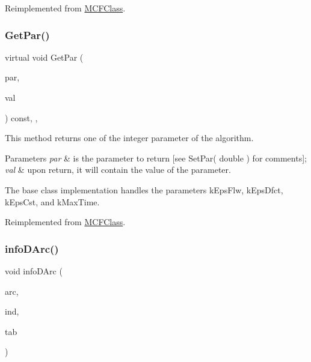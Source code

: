 Reimplemented from \mbox{\hyperlink{class_m_c_f_class_ac66ea95b63fe61ce67e0f8544f200887}{M\+C\+F\+Class}}.

\mbox{\label{class_m_c_f_simplex_a56cd6bb7b0a08a99f6acc82ef4bb4e9b}} 
\subsubsection{\texorpdfstring{Get\+Par()}{GetPar()}\hspace{0.1cm}{\footnotesize\ttfamily [2/2]}}
{\footnotesize\ttfamily virtual void Get\+Par (\begin{DoxyParamCaption}\item[{int}]{par,  }\item[{double \&}]{val }\end{DoxyParamCaption}) const\hspace{0.3cm}{\ttfamily [inline]}, {\ttfamily [override]}, {\ttfamily [virtual]}}

This method returns one of the integer parameter of the algorithm.


\begin{DoxyParams}{Parameters}
{\em par} & is the parameter to return \mbox{[}see Set\+Par( double ) for comments\mbox{]};\\
\hline
{\em val} & upon return, it will contain the value of the parameter.\\
\hline
\end{DoxyParams}
The base class implementation handles the parameters k\+Eps\+Flw, k\+Eps\+Dfct, k\+Eps\+Cst, and k\+Max\+Time. 

Reimplemented from \mbox{\hyperlink{class_m_c_f_class_a677caf4176eef1509a0fdf87c0662897}{M\+C\+F\+Class}}.

\mbox{\label{class_m_c_f_simplex_af2186258fb5ad398102bb7a6c1cfdce7}} 
\subsubsection{\texorpdfstring{info\+D\+Arc()}{infoDArc()}}
{\footnotesize\ttfamily void info\+D\+Arc (\begin{DoxyParamCaption}\item[{\mbox{\hyperlink{struct_m_c_f_simplex_1_1arc_d_type}{arc\+D\+Type}} $\ast$}]{arc,  }\item[{int}]{ind,  }\item[{int}]{tab }\end{DoxyParamCaption})\hspace{0.3cm}{\ttfamily [private]}}

